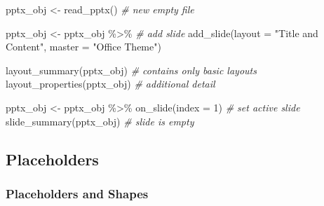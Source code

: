 \documentclass[
]{book}
\newenvironment{Shaded}{\begin{snugshade}}{\end{snugshade}}
\newcommand{\AttributeTok}[1]{\textcolor[rgb]{0.77,0.63,0.00}{#1}}
\newcommand{\CommentTok}[1]{\textcolor[rgb]{0.56,0.35,0.01}{\textit{#1}}}
\newcommand{\DecValTok}[1]{\textcolor[rgb]{0.00,0.00,0.81}{#1}}
\newcommand{\FunctionTok}[1]{\textcolor[rgb]{0.00,0.00,0.00}{#1}}
\newcommand{\NormalTok}[1]{#1}
\newcommand{\OtherTok}[1]{\textcolor[rgb]{0.56,0.35,0.01}{#1}}
\newcommand{\SpecialCharTok}[1]{\textcolor[rgb]{0.00,0.00,0.00}{#1}}
\newcommand{\StringTok}[1]{\textcolor[rgb]{0.31,0.60,0.02}{#1}}
\begin{document}
\begin{Shaded}
\begin{Highlighting}[]
\NormalTok{pptx\_obj }\OtherTok{\textless{}{-}} \FunctionTok{read\_pptx}\NormalTok{() }\CommentTok{\# new empty file}

\NormalTok{pptx\_obj }\OtherTok{\textless{}{-}}\NormalTok{ pptx\_obj }\SpecialCharTok{\%\textgreater{}\%} \CommentTok{\# add slide}
  \FunctionTok{add\_slide}\NormalTok{(}\AttributeTok{layout =} \StringTok{"Title and Content"}\NormalTok{, }\AttributeTok{master =} \StringTok{"Office Theme"}\NormalTok{)}

\FunctionTok{layout\_summary}\NormalTok{(pptx\_obj) }\CommentTok{\# contains only basic layouts}
\FunctionTok{layout\_properties}\NormalTok{(pptx\_obj) }\CommentTok{\# additional detail}

\NormalTok{pptx\_obj }\OtherTok{\textless{}{-}}\NormalTok{ pptx\_obj }\SpecialCharTok{\%\textgreater{}\%} 
  \FunctionTok{on\_slide}\NormalTok{(}\AttributeTok{index =} \DecValTok{1}\NormalTok{) }\CommentTok{\# set active slide}
\FunctionTok{slide\_summary}\NormalTok{(pptx\_obj) }\CommentTok{\# slide is empty}
\end{Highlighting}
\end{Shaded}

\hypertarget{placeholders}{%
\subsection{Placeholders}\label{placeholders}}

\hypertarget{placeholders-and-shapes}{%
\subsubsection{Placeholders and Shapes}\label{placeholders-and-shapes}}
\end{document}
